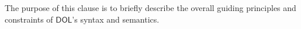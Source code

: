 \documentclass[10pt,fleqn,final]{scrreprt}
\makeatletter
\newcommand*\CommentAuthor{}
\renewcommand*\CommentAuthor{#1}}
\newcommand*\CommentDate{}
\renewcommand*\CommentDate{#1}}
\newcommand*\CommentId{}
\renewcommand*\CommentId{#1}}
\newcommand*\CommentType{}
\renewcommand*\CommentType{#1}}
\newcommand*{\SetCommentColorByType}[1]{%
\edef\localType{{#1}}%
\expandafter\ifstrequal\localType{q-aut}{\colorlet{CommentColor}{red}}{%
\expandafter\ifstrequal\localType{q-all}{\colorlet{CommentColor}{orange}}{%
\expandafter\ifstrequal\localType{todo}{\colorlet{CommentColor}{orange}}{%
\expandafter\ifstrequal\localType{fyi}{\colorlet{CommentColor}{lightgray}}{%
\colorlet{CommentColor}{yellow}}}}}}
\newcommand*{\SetCommentPrefixByType}[1]{%
\edef\localType{{#1}}%
\expandafter\@ifmtarg\localType{%
\edef\CommentPrefix{}%
}{%
\caseupper[q]{#1}%
\edef\CommentPrefix{\thestring: }%
}}
\newcommand*{\initComment}[1]{%
\setkeys{Comment}{#1}%
\SetCommentColorByType{\CommentType}%
\relax%
\SetCommentPrefixByType{\CommentType}%
\relax%
}
\newcommand*{\todonote}[2][]{%
\initComment{#1}%
\pdfcomment[author=\CommentAuthor,color=CommentColor,date=\CommentDate,id=\CommentId]{%
\CommentPrefix
#2}}
\renewcommand*{\todonote}[2][]{%
\initComment{#1}%
\ednote{\CommentPrefix #2}}
\newcommand*{\CLnote}[2][author=Christoph Lange]{%
\todonote[author=Christoph Lange,#1]{#2} 
}
\newcommand*{\shall}{\textbf{shall}\xspace}
\newcommand*{\should}{\textbf{should}\xspace}
\newcommand*{\IS}{OMG Specification\xspace}
\newcommand*{\DOL}{\ensuremath{\mathsf{DOL}}\xspace}
\newenvironment{definitions}[0]{\medskip }{}
\makeatother
\begin{document}
\begin{definitions}
%
%
%
The purpose of this clause is to briefly describe the 
 overall guiding principles and constraints of \DOL's syntax and semantics.
%
%
%
%
%
%
%

\end{definitions}
\end{document}
